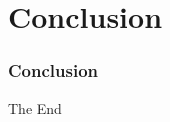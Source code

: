 \section{Conclusion}

\begin{frame}
    \frametitle{Conclusion}
    \Huge{\centerline{The End}}
\end{frame}
    
